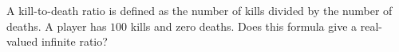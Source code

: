 A kill-to-death ratio is defined as the number of kills divided by the number of deaths. A player has $100$ kills and zero deaths. Does this formula give a real-valued infinite ratio?
